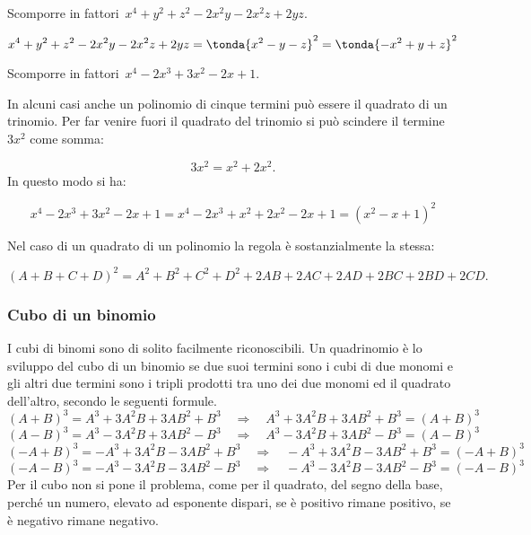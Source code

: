 \begin{esempio}{}{}
Scomporre in fattori~\(x^4+y^{2}+z^{2}-2x^2y-2x^2z+2yz\).

\vspace{-2.0em}
\[x^4+y^{2}+z^{2}-2x^2y-2x^2z+2yz=
  \tonda{x^2-y-z}^{2}=\tonda{-x^2+y+z}^{2}\]
\end{esempio}

\begin{esempio}{}{}
Scomporre in fattori~\(x^4-2x^3+3x^2-2x+1\).

In alcuni casi anche un polinomio di cinque termini può essere il quadrato di 
un trinomio.
Per far venire fuori il quadrato del trinomio si può scindere il 
termine~\(3x^2\) come somma:

\vspace{-1.5em}
\[3x^2=x^2+2x^2.\]
In questo modo si ha:

\vspace{-1.5em}
\[x^4-2x^3+3x^2-2x+1=x^4-2x^3+x^2+2x^2-2x+1=(x^2-x+1)^{2}\]
\end{esempio}

Nel caso di un quadrato di un polinomio la regola è sostanzialmente la 
stessa:

\vspace{-1.0em}
\begin{equation*}
(A+B+C+D)^{2}=A^{2}+B^{2}+C^{2}+D^{2}+2AB+2AC+2AD+2BC+2BD+2CD.
\end{equation*}

\subsubsection{Cubo di un binomio}
\label{subsubsec:divpol_cubobin}

I cubi di binomi sono di solito facilmente riconoscibili. Un quadrinomio è lo 
sviluppo del cubo di un binomio se due suoi termini sono i cubi di due monomi 
e gli altri due termini sono i tripli prodotti tra uno dei due monomi ed il 
quadrato dell'altro, secondo le seguenti formule.
\[(A+B)^{3}=A^{3}+3A^{2}B+3AB^{2}+B^{3}\quad \Rightarrow \quad 
A^{3}+3A^{2}B+3AB^{2}+B^{3}=(A+B)^{3}\]
\[(A-B)^{3}=A^{3}-3A^{2}B+3AB^{2}-B^{3}\quad \Rightarrow \quad 
A^{3}-3A^{2}B+3AB^{2}-B^{3}=(A-B)^{3}\]
\[(-A+B)^{3}=-A^{3}+3A^{2}B-3AB^{2}+B^{3}\quad \Rightarrow \quad 
-A^{3}+3A^{2}B-3AB^{2}+B^{3}=(-A+B)^{3}\]
\[(-A-B)^{3}=-A^{3}-3A^{2}B-3AB^{2}-B^{3}\quad \Rightarrow \quad 
-A^{3}-3A^{2}B-3AB^{2}-B^{3}=(-A-B)^{3}\]
Per il cubo non si pone il problema, come per il quadrato, del segno della 
base, perché un numero, elevato ad esponente dispari, se è positivo rimane 
positivo, se è negativo rimane negativo.


